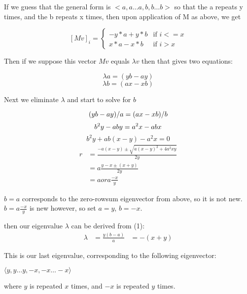 \documentclass[10pt,a4paper]{report}
\begin{document}
If we guess that the general form is $<a, a\ldots a, b, b\ldots b>$ so that the
a repeats y times, and the b repeats x times, then upon application of M as
above, we get

\[ {[Mv]}_i = \begin{cases}
	-y*a + y*b & \text{if } i <= x\\
	x*a - x*b & \text{if } i > x
\end{cases} \]

Then if we suppose this vector $Mv$ equals $\lambda v$ then that gives two
equations:

\begin{equation}
	\lambda a = (yb - ay)
\end{equation}
\begin{equation*}
	\lambda b = (ax - xb)
\end{equation*}

Next we eliminate $\lambda$ and start to solve for $b$

\begin{equation*}
	(yb - ay)/a = (ax - xb)/b\\
\end{equation*}
\begin{equation*}
	b^2y - aby = a^2x - abx\\
\end{equation*}
\begin{equation*}
	b^2y + ab(x - y) - a^2x = 0
\end{equation*}
\begin{align*}
	r &= \frac{-a(x-y) \pm \sqrt{{a(x-y)}^2 + 4a^2xy}}{2y}\\
	  &= a\frac{y - x \pm (x + y)}{2y}\\
	  &= a or a\frac{-x}{y}
\end{align*}

$b = a$ corresponds to the zero-rowsum eigenvector from above, so it is not
new.
$b = a\frac{-x}{y}$ is new however, so set $a = y$, $b = -x$.

then our eigenvalue $\lambda$ can be derived from (1):
\begin{align*}
	\lambda &= \frac{y(b - a)}{a}
			&= -(x + y)
\end{align*}

This is our last eigenvalue, corresponding to the following eigenvector:

$\langle y, y\ldots y, -x, -x\ldots -x\rangle$

where $y$ is repeated $x$ times, and $-x$ is repeated $y$ times.
\end{document}
